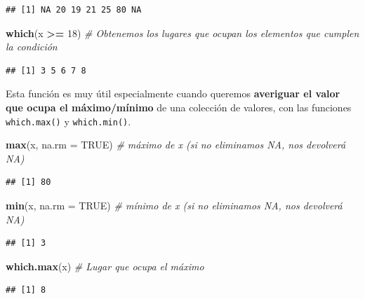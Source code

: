 \documentclass[11pt,]{book}
\newenvironment{Shaded}{\begin{snugshade}}{\end{snugshade}}
\newcommand{\CommentTok}[1]{\textcolor[rgb]{0.37,0.37,0.37}{\textit{#1}}}
\newcommand{\DataTypeTok}[1]{\textcolor[rgb]{0.27,0.27,0.27}{#1}}
\newcommand{\DecValTok}[1]{\textcolor[rgb]{0.06,0.06,0.06}{#1}}
\newcommand{\KeywordTok}[1]{\textcolor[rgb]{0.27,0.27,0.27}{\textbf{#1}}}
\newcommand{\NormalTok}[1]{#1}
\newcommand{\OperatorTok}[1]{\textcolor[rgb]{0.43,0.43,0.43}{\textbf{#1}}}
\newcommand{\OtherTok}[1]{\textcolor[rgb]{0.37,0.37,0.37}{#1}}
\newcommand{\StringTok}[1]{\textcolor[rgb]{0.5,0.5,0.5}{#1}}
\begin{document}
\begin{verbatim}
## [1] NA 20 19 21 25 80 NA
\end{verbatim}

\begin{Shaded}
\begin{Highlighting}[]
\KeywordTok{which}\NormalTok{(x }\OperatorTok{>=}\StringTok{ }\DecValTok{18}\NormalTok{) }\CommentTok{# Obtenemos los lugares que ocupan los elementos que cumplen la condición}
\end{Highlighting}
\end{Shaded}

\begin{verbatim}
## [1] 3 5 6 7 8
\end{verbatim}

Esta función es muy útil especialmente cuando queremos \textbf{averiguar el valor que ocupa el máximo/mínimo} de una colección de valores, con las funciones \texttt{which.max()} y \texttt{which.min()}.

\begin{Shaded}
\begin{Highlighting}[]
\KeywordTok{max}\NormalTok{(x, }\DataTypeTok{na.rm =} \OtherTok{TRUE}\NormalTok{) }\CommentTok{# máximo de x (si no eliminamos NA, nos devolverá NA)}
\end{Highlighting}
\end{Shaded}

\begin{verbatim}
## [1] 80
\end{verbatim}

\begin{Shaded}
\begin{Highlighting}[]
\KeywordTok{min}\NormalTok{(x, }\DataTypeTok{na.rm =} \OtherTok{TRUE}\NormalTok{) }\CommentTok{# mínimo de x (si no eliminamos NA, nos devolverá NA)}
\end{Highlighting}
\end{Shaded}

\begin{verbatim}
## [1] 3
\end{verbatim}

\begin{Shaded}
\begin{Highlighting}[]
\KeywordTok{which.max}\NormalTok{(x) }\CommentTok{# Lugar que ocupa el máximo}
\end{Highlighting}
\end{Shaded}

\begin{verbatim}
## [1] 8
\end{verbatim}
\end{document}
